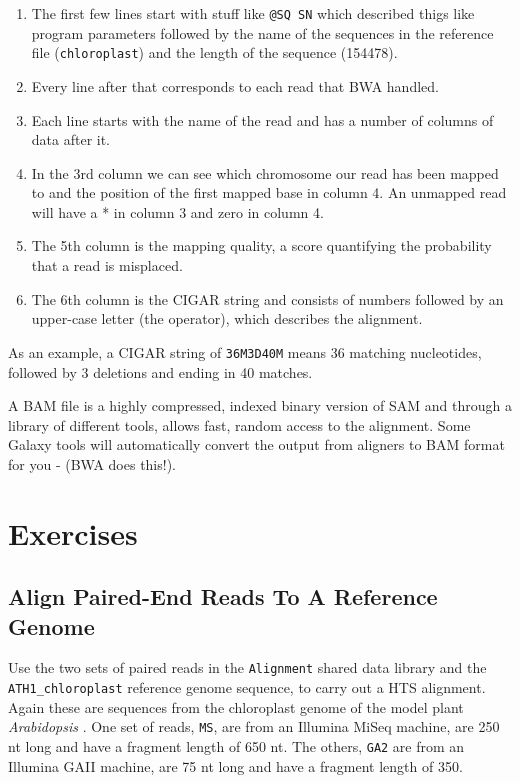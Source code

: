 \documentclass[12pt,]{book}
\providecommand{\tightlist}{%
  \setlength{\itemsep}{0pt}\setlength{\parskip}{0pt}}
\theoremstyle{definition}
\theoremstyle{definition}
\theoremstyle{remark}
\begin{document}
\begin{enumerate}
\def\labelenumi{\arabic{enumi}.}
\tightlist
\item
  The first few lines start with stuff like \texttt{@SQ\ SN} which
  described thigs like program parameters followed by the name of the
  sequences in the reference file (\texttt{chloroplast}) and the length
  of the sequence (154478).
\item
  Every line after that corresponds to each read that BWA handled.
\item
  Each line starts with the name of the read and has a number of columns
  of data after it.
\item
  In the 3rd column we can see which chromosome our read has been mapped
  to and the position of the first mapped base in column 4. An unmapped
  read will have a * in column 3 and zero in column 4.
\item
  The 5th column is the mapping quality, a score quantifying the
  probability that a read is misplaced.
\item
  The 6th column is the CIGAR string and consists of numbers followed by
  an upper-case letter (the operator), which describes the alignment.
\end{enumerate}

As an example, a CIGAR string of \texttt{36M3D40M} means 36 matching
nucleotides, followed by 3 deletions and ending in 40 matches.

A BAM file is a highly compressed, indexed binary version of SAM and
through a library of different tools, allows fast, random access to the
alignment. Some Galaxy tools will automatically convert the output from
aligners to BAM format for you - (BWA does this!).

\section{Exercises}\label{exercises-1}

\subsection{Align Paired-End Reads To A Reference
Genome}\label{align-paired-end-reads-to-a-reference-genome}

Use the two sets of paired reads in the \texttt{Alignment} shared data
library and the \texttt{ATH1\_chloroplast} reference genome sequence, to
carry out a HTS alignment. Again these are sequences from the
chloroplast genome of the model plant \emph{Arabidopsis} . One set of
reads, \texttt{MS}, are from an Illumina MiSeq machine, are 250 nt long
and have a fragment length of 650 nt. The others, \texttt{GA2} are from
an Illumina GAII machine, are 75 nt long and have a fragment length of
350.
\end{document}
